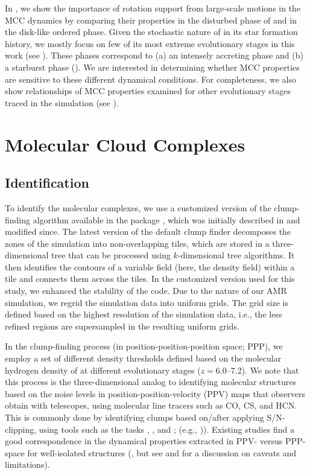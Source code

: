 \IfFileExists{emulateapjlegacy.cls}{\documentclass[iop]{emulateapjlegacy}}{\documentclass[iop]{emulateapj}}
\begin{document}
In , we show the importance of rotation support from large-scale motions in the MCC dynamics 
by comparing their properties in the disturbed phase of \flower and in the disk-like ordered phase.
%
Given the stochastic nature of \flower in its star formation history, we mostly focus on few of its most extreme evolutionary stages in this work (see ).
%
These phases correspond to (a) an intensely accreting phase and (b) a starburst phase (). We are interested in determining whether MCC properties are sensitive to these different dynamical conditions. For completeness, we also show relationships of MCC properties examined for other evolutionary stages traced in the simulation (see ).

\section{Molecular Cloud Complexes}\label{sec:eqn}

\subsection{Identification}\label{sec:method}

To identify the molecular complexes, we use a customized version of the clump-finding algorithm available in the  package  \citep{Turk11a}, which was initially described in \citet{Smith09a} and modified since.
%
The latest version of the default  clump finder decomposes the zones of the simulation into non-overlapping tiles, which are stored in a three-dimensional tree that can be processed using $k$-dimensional tree algorithms. It then identifies the contours of a variable field (here, the density field) within a tile and connects them across the tiles. In the customized version used for this study, we enhanced the stability of the code.
%
Due to the nature of our AMR simulation, we regrid the simulation data into uniform grids. The grid size is defined based on the highest resolution of the simulation data, i.e., the less refined regions are supersampled in the resulting uniform grids.

In the clump-finding process (in position-position-position space; PPP), we employ a set of different density thresholds defined based on the molecular hydrogen density of \flower at different evolutionary stages ($z=6.0$--7.2).
%
We note that this process is the three-dimensional analog to identifying molecular structures based on the noise levels in position-position-velocity (PPV) maps that observers obtain with telescopes, using molecular line tracers such as CO, CS, and HCN. This is commonly done by identifying clumps based on/after applying S/N-clipping, using tools such as the  tasks , , and ; (e.g., \citealt{Williams94a, Oka01a, Rosolowsky06a, Rosolowsky08a, DonovanMeyer13a})).
%
Existing studies find a good correspondence in the dynamical properties extracted in PPV- versus PPP-space for well-isolated structures (\citealt{Ballesteros-Paredes02a, Heitsch09a, Shetty10a, Beaumont13a, Pan15a}, but see \citealt{Ballesteros-Paredes02a} and \citealt{Shetty10a} for a discussion on caveats and limitations).
\end{document}
